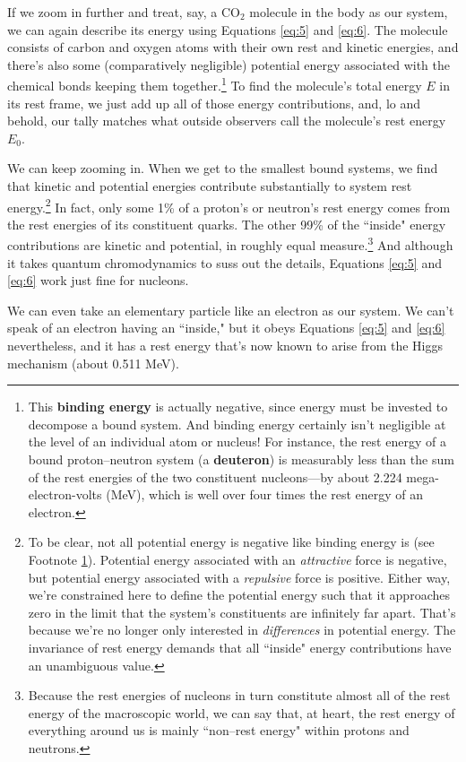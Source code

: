 \documentclass[12pt]{article}
\begin{document}
If we zoom in further and treat, say, a CO$_2$ molecule in the body as our system, we can again describe its energy using Equations \ref{eq:5} and \ref{eq:6}. The molecule consists of carbon and oxygen atoms with their own rest and kinetic energies, and there's also some (comparatively negligible) potential energy associated with the chemical bonds keeping them together.\footnote{\label{fn:be}This \textbf{binding energy} is actually negative, since energy must be invested to decompose a bound system. And binding energy certainly isn't negligible at the level of an individual atom or nucleus! For instance, the rest energy of a bound proton--neutron system (a \textbf{deuteron}) is measurably less than the sum of the rest energies of the two constituent nucleons---by about 2.224 mega-electron-volts (MeV), which is well over four times the rest energy of an electron.} To find the molecule's total energy $E$ in its rest frame, we just add up all of those energy contributions, and, lo and behold, our tally matches what outside observers call the molecule's rest energy $E_0$.

We can keep zooming in. When we get to the smallest bound systems, we find that kinetic and potential energies contribute substantially to system rest energy.\footnote{To be clear, not all potential energy is negative like binding energy is (see Footnote \ref{fn:be}). Potential energy associated with an \emph{attractive} force is negative, but potential energy associated with a \emph{repulsive} force is positive. Either way, we're constrained here to define the potential energy such that it approaches zero in the limit that the system's constituents are infinitely far apart. That's because we're no longer only interested in \emph{differences} in potential energy. The invariance of rest energy demands that all ``inside" energy contributions have an unambiguous value.} In fact, only some 1\% of a proton's or neutron's rest energy comes from the rest energies of its constituent quarks. The other 99\% of the ``inside" energy contributions are kinetic and potential, in roughly equal measure.\footnote{\label{fn:mwm}Because the rest energies of nucleons in turn constitute almost all of the rest energy of the macroscopic world, we can say that, at heart, the rest energy of everything around us is mainly ``non--rest energy" within protons and neutrons.} And although it takes quantum chromodynamics to suss out the details, Equations \ref{eq:5} and \ref{eq:6} work just fine for nucleons.

We can even take an elementary particle like an electron as our system. We can't speak of an electron having an ``inside," but it obeys Equations \ref{eq:5} and \ref{eq:6} nevertheless, and it has a rest energy that's now known to arise from the Higgs mechanism (about 0.511 MeV).
\end{document}
